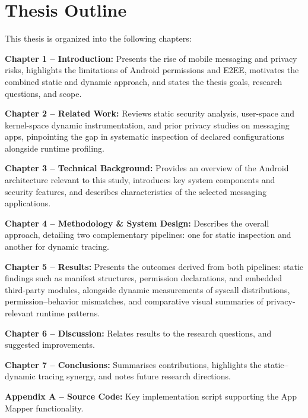 \documentclass[a4paper,12pt]{report}
\begin{document}
\section{Thesis Outline}
This thesis is organized into the following chapters:

\textbf{Chapter 1 – Introduction:} Presents the rise of mobile messaging and privacy risks, highlights the limitations of Android permissions and E2EE, motivates the combined static and dynamic approach, and states the thesis goals, research questions, and scope.

\vspace{0.4em}
\textbf{Chapter 2 – Related Work:} Reviews static security analysis, user-space and kernel-space dynamic instrumentation, and prior privacy studies on messaging apps, pinpointing the gap in systematic inspection of declared configurations alongside runtime profiling.

\vspace{0.4em}
\textbf{Chapter 3 – Technical Background:} Provides an overview of the Android architecture relevant to this study, introduces key system components and security features, and describes characteristics of the selected messaging applications.

\vspace{0.4em}
\textbf{Chapter 4 – Methodology \& System Design:} Describes the overall approach, detailing two complementary pipelines: one for static inspection and another for dynamic tracing.

\vspace{0.4em}
\textbf{Chapter 5 – Results:} Presents the outcomes derived from both pipelines: static findings such as manifest structures, permission declarations, and embedded third-party modules, alongside dynamic measurements of syscall distributions, permission–behavior mismatches, and comparative visual summaries of privacy-relevant runtime patterns.

\vspace{0.4em}
\textbf{Chapter 6 – Discussion:} Relates results to the research questions, and suggested improvements.

\vspace{0.4em}
\textbf{Chapter 7 – Conclusions:} Summarises contributions, highlights the static–dynamic tracing synergy, and notes future research directions.

\vspace{0.4em}
\textbf{Appendix A – Source Code:} Key implementation script supporting the App Mapper functionality.
\end{document}
